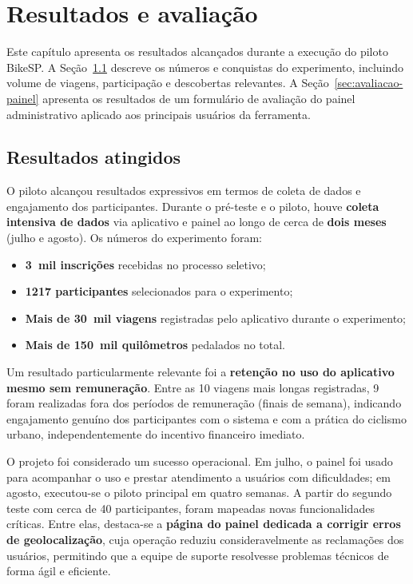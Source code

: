 
\chapter{Resultados e avaliação}
\label{cap:resultados}

Este capítulo apresenta os resultados alcançados durante a execução do piloto BikeSP. A Seção~\ref{sec:resultados-atingidos} descreve os números e conquistas do experimento, incluindo volume de viagens, participação e descobertas relevantes. A Seção~\ref{sec:avaliacao-painel} apresenta os resultados de um formulário de avaliação do painel administrativo aplicado aos principais usuários da ferramenta.

\section{Resultados atingidos}
\label{sec:resultados-atingidos}
O piloto alcançou resultados expressivos em termos de coleta de dados e
engajamento dos participantes. Durante o pré-teste e o piloto, houve
\textbf{coleta intensiva de dados} via aplicativo e painel ao longo de cerca de
\textbf{dois meses} (julho e agosto). Os números do experimento foram:
\begin{itemize}
  \item \textbf{3~mil inscrições} recebidas no processo seletivo;
  \item \textbf{1217 participantes} selecionados para o experimento;
  \item \textbf{Mais de 30~mil viagens} registradas pelo aplicativo durante o
        experimento;
  \item \textbf{Mais de 150~mil quilômetros} pedalados no total.
\end{itemize}

Um resultado particularmente relevante foi a \textbf{retenção no uso do
aplicativo mesmo sem remuneração}. Entre as 10 viagens mais longas registradas,
9 foram realizadas fora dos períodos de remuneração (finais de semana),
indicando engajamento genuíno dos participantes com o sistema e com a prática do
ciclismo urbano, independentemente do incentivo financeiro imediato.

O projeto foi considerado um sucesso operacional. Em julho, o painel foi usado
para acompanhar o uso e prestar atendimento a usuários com dificuldades; em
agosto, executou-se o piloto principal em quatro semanas. A partir do segundo
teste com cerca de 40 participantes, foram mapeadas novas funcionalidades
críticas. Entre elas, destaca-se a \textbf{página do painel dedicada a corrigir
erros de geolocalização}, cuja operação reduziu consideravelmente as reclamações
dos usuários, permitindo que a equipe de suporte resolvesse problemas técnicos
de forma ágil e eficiente.

